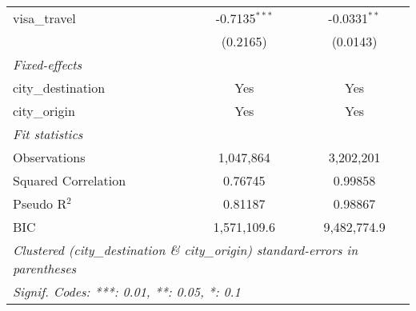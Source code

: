 \begin{tabular}{lcc}
   visa\_travel                      & -0.7135$^{***}$   & -0.0331$^{**}$\\   
                                     & (0.2165)          & (0.0143)\\   
   \midrule
   \emph{Fixed-effects}\\
   city\_destination                 & Yes               & Yes\\  
   city\_origin                      & Yes               & Yes\\  
   \midrule
   \emph{Fit statistics}\\
   Observations                      & 1,047,864         & 3,202,201\\  
   Squared Correlation               & 0.76745           & 0.99858\\  
   Pseudo R$^2$                      & 0.81187           & 0.98867\\  
   BIC                               & 1,571,109.6       & 9,482,774.9\\  
   \midrule \midrule
   \multicolumn{3}{l}{\emph{Clustered (city\_destination \& city\_origin) standard-errors in parentheses}}\\
   \multicolumn{3}{l}{\emph{Signif. Codes: ***: 0.01, **: 0.05, *: 0.1}}\\
\end{tabular}
\par\endgroup


